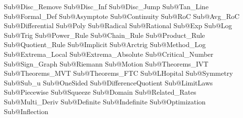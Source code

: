 Sub@Disc_Remove 			%
Sub@Disc_Inf				%
Sub@Disc_Jump				%
Sub@Tan_Line				%
Sub@Formal_Def				%
Sub@Asymptote				%
Sub@Continuity				%
Sub@RoC						%
Sub@Avg_RoC					%
Sub@Differential			%
Sub@Poly					%
Sub@Radical					%
Sub@Rational				%
Sub@Exp						%
Sub@Log						%
Sub@Trig					%
Sub@Power_Rule				%
Sub@Chain_Rule				%
Sub@Product_Rule			%
Sub@Quotient_Rule			%
Sub@Implicit				%
Sub@Arctrig					%
Sub@Method_Log				%
Sub@Extrema_Local			%
Sub@Extrema_Absolute		%
Sub@Critical_Number			%
Sub@Sign_Graph				%
Sub@Riemann					%
Sub@Motion					%
Sub@Theorems_IVT			%
Sub@Theorems_MVT			%
Sub@Theorems_FTC			%
Sub@LHopital				%
Sub@Symmetry				%
Sub@Sub_u					%
Sub@OneSided				%
Sub@DifferenceQuotient		%
Sub@LimitLaws				%
Sub@Piecewise				%
Sub@Squeeze					%
Sub@Domain					%
Sub@Related_Rates			%
Sub@Multi_Deriv				%
Sub@Definite				%
Sub@Indefinite				%
Sub@Optimization			%
Sub@Inflection				%






